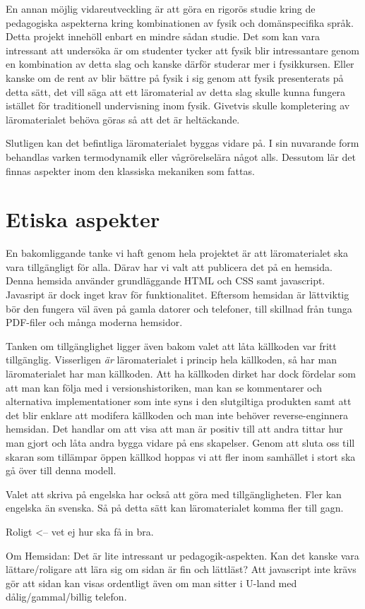\begin{binge}
En annan möjlig vidareutveckling är att göra en rigorös studie kring de pedagogiska aspekterna kring kombinationen av fysik och domänspecifika språk. Detta projekt innehöll enbart en mindre sådan studie. Det som kan vara intressant att undersöka är om studenter tycker att fysik blir intressantare genom en kombination av detta slag och kanske därför studerar mer i fysikkursen. Eller kanske om de rent av blir bättre på fysik i sig genom att fysik presenterats på detta sätt, det vill säga att ett läromaterial av detta slag skulle kunna fungera istället för traditionell undervisning inom fysik. Givetvis skulle kompletering av läromaterialet behöva göras så att det är heltäckande.

Slutligen kan det befintliga läromaterialet byggas vidare på. I sin nuvarande form behandlas varken termodynamik eller vågrörelselära något alls. Dessutom lär det finnas aspekter inom den klassiska mekaniken som fattas.

\section{Etiska aspekter}

En bakomliggande tanke vi haft genom hela projektet är att läromaterialet ska vara tillgängligt för alla. Därav har vi valt att publicera det på en hemsida. Denna hemsida använder grundläggande HTML och CSS samt javascript. Javasript är dock inget krav för funktionalitet. Eftersom hemsidan är lättviktig bör den fungera väl även på gamla datorer och telefoner, till skillnad från tunga PDF-filer och många moderna hemsidor.

Tanken om tillgänglighet ligger även bakom valet att låta källkoden var fritt tillgänglig. Visserligen \textit{är} läromaterialet i princip hela källkoden, så har man läromaterialet har man källkoden. Att ha källkoden dirket har dock fördelar som att man kan följa med i versionshistoriken, man kan se kommentarer och alternativa implementationer som inte syns i den slutgiltiga produkten samt att det blir enklare att modifera källkoden och man inte behöver reverse-enginnera hemsidan. Det handlar om att visa att man är positiv till att andra tittar hur man gjort och låta andra bygga vidare på ens skapelser. Genom att sluta oss till skaran som tillämpar öppen källkod hoppas vi att fler inom samhället i stort ska gå över till denna modell.

Valet att skriva på engelska har också att göra med tillgängligheten. Fler kan engelska än svenska. Så på detta sätt kan läromaterialet komma fler till gagn.

Roligt <-- vet ej hur ska få in bra.



Om Hemsidan:
  Det är lite intressant ur pedagogik-aspekten. Kan det
  kanske vara lättare/roligare att lära sig om sidan är fin och
  lättläst? Att javascript inte krävs gör att sidan kan visas ordentligt
  även om man sitter i U-land med dålig/gammal/billig telefon.


\end{binge}
